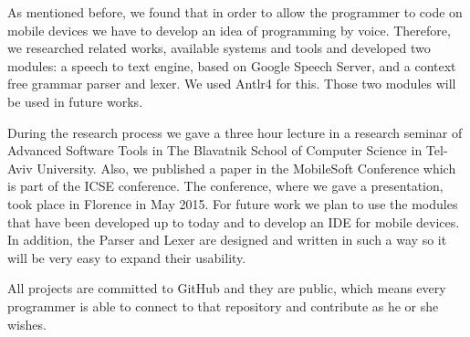 As mentioned before, we found that in order to allow the programmer to code on mobile devices we have to develop an idea of programming by voice. Therefore, we researched related works, available systems and tools and developed two modules: a speech to text engine, based on Google Speech Server, and a context free grammar parser and lexer. We used Antlr4 for this. Those two modules will be used in future works.

During the research process we gave a three hour lecture in a research seminar of Advanced Software Tools in The Blavatnik School of Computer Science in Tel-Aviv University. Also, we published a paper in the MobileSoft Conference which is part of the ICSE conference. The conference, where we gave a presentation, took place in Florence in May 2015.
For future work we plan to use the modules that have been developed up to today and to develop an IDE for mobile devices. In addition, the Parser and Lexer are designed and written in such a way so it will be very easy to expand their usability.

All projects are committed to GitHub and they are public, which means every programmer is able to connect to that repository and contribute as he or she wishes.